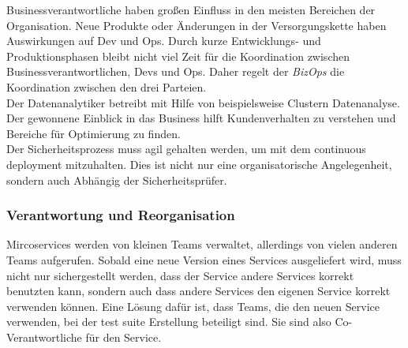 Businessverantwortliche haben großen Einfluss in den meisten Bereichen der Organisation. Neue Produkte oder Änderungen in der Versorgungskette haben Auswirkungen auf Dev und Ops. Durch kurze Entwicklungs- und Produktionsphasen bleibt nicht viel Zeit für die Koordination zwischen Businessverantwortlichen, Devs und Ops. Daher regelt der \textit{BizOps} die Koordination zwischen den drei Parteien.\\
Der Datenanalytiker betreibt mit Hilfe von beispielsweise Clustern Datenanalyse. Der gewonnene Einblick in das Business hilft Kundenverhalten zu verstehen und Bereiche für Optimierung zu finden.\\
Der Sicherheitsprozess muss agil gehalten werden, um mit dem continuous deployment mitzuhalten. Dies ist nicht nur eine organisatorische Angelegenheit, sondern auch Abhängig der Sicherheitsprüfer.

\subsubsection{Verantwortung und Reorganisation}

Mircoservices werden von kleinen Teams verwaltet, allerdings von vielen anderen Teams aufgerufen. Sobald eine neue Version eines Services ausgeliefert wird, muss nicht nur sichergestellt werden, dass der Service andere Services korrekt benutzten kann, sondern auch dass andere Services den eigenen Service korrekt verwenden können. Eine Lösung dafür ist, dass Teams, die den neuen Service verwenden, bei der test suite Erstellung beteiligt sind. Sie sind also Co-Verantwortliche für den Service. 


